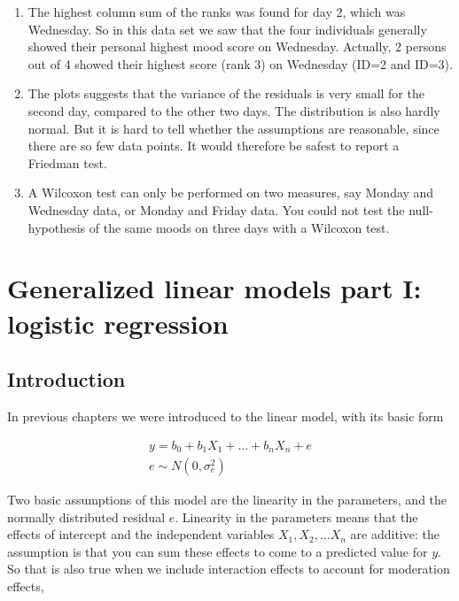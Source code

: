 \documentclass[]{report}\usepackage[]{graphicx}\usepackage[]{color}
\begin{document}
\begin{enumerate}
\item The highest column sum of the ranks was found for day 2, which was Wednesday. So in this data set we saw that the four individuals generally showed their personal highest mood score on Wednesday. Actually, 2 persons out of 4 showed their highest score (rank 3) on Wednesday (ID=2 and ID=3).

\item The plots suggests that the variance of the residuals is very small for the second day, compared to the other two days. The distribution is also hardly normal. But it is hard to tell whether the assumptions are reasonable, since there are so few data points. It would therefore be safest to report a Friedman test.

\item A Wilcoxon test can only be performed on two measures, say Monday and Wednesday data, or Monday and Friday data. You could not test the null-hypothesis of the same moods on three days with a Wilcoxon test.

\end{enumerate}



%




\chapter{Generalized linear models part I: logistic regression}

\section{Introduction}
In previous chapters we were introduced to the linear model, with its basic form


\begin{eqnarray}
y = b_0 + b_1 X_1 + \dots + b_n X_n + e \\
e \sim N(0, \sigma_e^2)
\end{eqnarray}

Two basic assumptions of this model are the linearity in the parameters, and the normally distributed residual $e$. Linearity in the parameters means that the effects of intercept and the independent variables $X_1, X_2, \dots X_n$ are additive: the assumption is that you can sum these effects to come to a predicted value for $y$. So that is also true when we include interaction effects to account for moderation effects,
\end{document}
